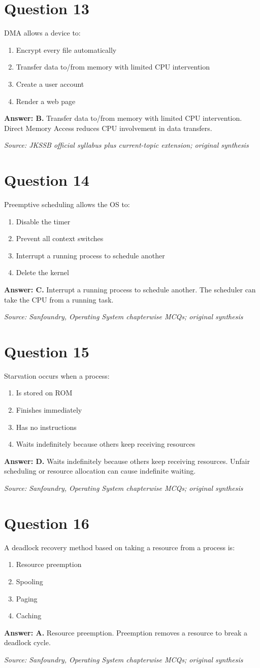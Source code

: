 \documentclass[11pt,a4paper]{book}
\newcommand{\source}[1]{\par\smallskip\textit{Source: #1}}
\newcommand{\answer}[2]{\par\textbf{Answer: #1.} #2}
\begin{document}
\section*{Question 13}
DMA allows a device to:
\begin{enumerate}[label=\Alph*.]
\item Encrypt every file automatically
\item Transfer data to/from memory with limited CPU intervention
\item Create a user account
\item Render a web page
\end{enumerate}
\answer{B}{Transfer data to/from memory with limited CPU intervention. Direct Memory Access reduces CPU involvement in data transfers.}
\source{JKSSB official syllabus plus current-topic extension; original synthesis}
\section*{Question 14}
Preemptive scheduling allows the OS to:
\begin{enumerate}[label=\Alph*.]
\item Disable the timer
\item Prevent all context switches
\item Interrupt a running process to schedule another
\item Delete the kernel
\end{enumerate}
\answer{C}{Interrupt a running process to schedule another. The scheduler can take the CPU from a running task.}
\source{Sanfoundry, Operating System chapterwise MCQs; original synthesis}
\section*{Question 15}
Starvation occurs when a process:
\begin{enumerate}[label=\Alph*.]
\item Is stored on ROM
\item Finishes immediately
\item Has no instructions
\item Waits indefinitely because others keep receiving resources
\end{enumerate}
\answer{D}{Waits indefinitely because others keep receiving resources. Unfair scheduling or resource allocation can cause indefinite waiting.}
\source{Sanfoundry, Operating System chapterwise MCQs; original synthesis}
\section*{Question 16}
A deadlock recovery method based on taking a resource from a process is:
\begin{enumerate}[label=\Alph*.]
\item Resource preemption
\item Spooling
\item Paging
\item Caching
\end{enumerate}
\answer{A}{Resource preemption. Preemption removes a resource to break a deadlock cycle.}
\source{Sanfoundry, Operating System chapterwise MCQs; original synthesis}
\end{document}
